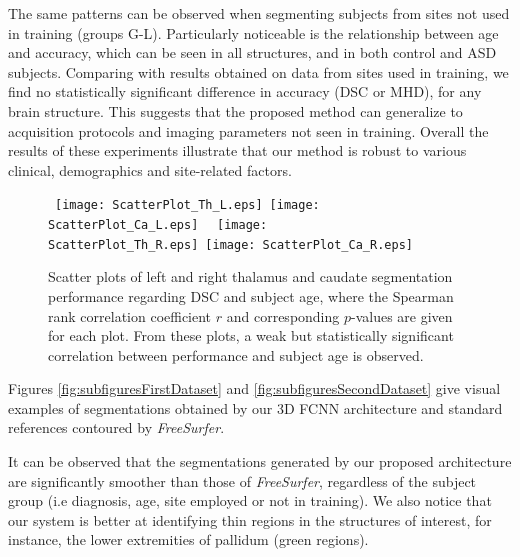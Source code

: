 \documentclass[twoside,fleqn,espcrc2]{elsarticle}
\newcommand{\FreeSurfer}{\textit{FreeSurfer}}
\begin{document}
The same patterns can be observed when segmenting subjects from sites not used in training (groups G-L). Particularly noticeable is the relationship between age and accuracy, which can be seen in all structures, and in both control and ASD subjects. Comparing with results obtained on data from sites used in training, we find no statistically significant difference in accuracy (DSC or MHD), for any brain structure. This suggests that the proposed method can generalize to acquisition protocols and imaging parameters not seen in training. Overall the results of these experiments illustrate that our method is robust to various clinical, demographics and site-related factors.

\begin{figure}[h!]
     \begin{center}
     \mbox{
        \texttt{[image: ScatterPlot\_Th\_L.eps]}
        \texttt{[image: ScatterPlot\_Ca\_L.eps]}
     }
     \mbox{
        \texttt{[image: ScatterPlot\_Th\_R.eps]}
        \texttt{[image: ScatterPlot\_Ca\_R.eps]}
     }

        \caption{Scatter plots of left and right thalamus and caudate segmentation performance regarding DSC and subject age, where the Spearman rank correlation coefficient $r$ and corresponding $p$-values are given for each plot. From these plots, a weak but statistically significant correlation between performance and subject age is observed.}
        \label{fig:scat}
\end{center}
\end{figure}



Figures \ref{fig:subfiguresFirstDataset} and \ref{fig:subfiguresSecondDataset} give visual examples of segmentations obtained by our 3D FCNN architecture and standard references contoured by \FreeSurfer{}.

It can be observed that the segmentations generated by our proposed architecture are significantly smoother than those of \FreeSurfer{}, regardless of the subject group (i.e diagnosis, age, site employed or not in training). We also notice that our system is better at identifying thin regions in the structures of interest, for instance, the lower extremities of pallidum (green regions).
\end{document}
